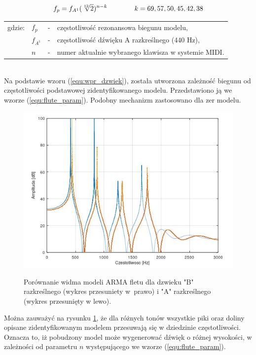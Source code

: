 \begin{equation} \label{equ:flute_param}
\openup\jot
\begin{aligned}[t]
f_{p} = f_{A^{1}}(\sqrt[12]{2})^{n-k} \\ 
\end{aligned}
\qquad\qquad %
\begin{aligned}[t]
k = 69, 57, 50, 45, 42, 38 \\
\end{aligned}
\end{equation}
\begin{tabular}{ l l l l}
	gdzie: & $f_{p}$ &  - & częstotliwość rezonansowa biegunu modelu, \\
	&	$f_{A^{1}}$ & - &  częstotliwość dźwięku A razkreślnego (440 Hz), \\
	&	$n$ & - &  numer aktualnie wybranego klawisza w systemie MIDI.\\
\end{tabular} \\

Na podstawie wzoru (\ref{equ:wpr_dzwiek}), została utworzona zależność biegunu od częstotliwości podstawowej zidentyfikowanego modelu. Przedstawiono ją we wzorze (\ref{equ:flute_param}). Podobny mechanizm zastosowano dla zer modelu. 

\begin{figure}[H]
	\centering
	\includegraphics[width=11.5cm]{grafiki/Model_B_A}
	\label{rys:por_mod_flet}
	\captionsetup{justification=centering}
	\caption{Porównanie widma modeli ARMA fletu dla dzwieku "B" razkreślnego (wykres przesuniety w~prawo) i "A" razkreślnego (wykres przesunięty w lewo).}
	\label{rys:por_mod_flet}
\end{figure}
Można zauważyć na rysunku \ref{rys:por_mod_flet}, że dla różnych tonów wszystkie piki oraz doliny opisane zidentyfikowanym modelem przesuwają się w dziedzinie częstotliwości. Oznacza to, iż pobudzony model może wygenerować dźwięk o różnej wysokości, w zależności od parametru $n$ występującego we wzorze (\ref{equ:flute_param}).


